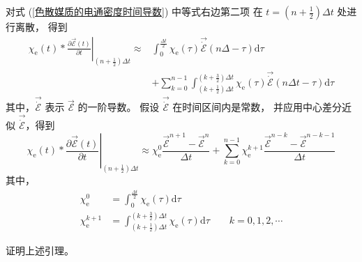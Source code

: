 \begin{lemma}
    对式 (\ref{色散媒质的电通密度时间导数}) 中等式右边第二项
    在 $t=\left(n+\frac{1}{2}\right)\Delta t$ 处进行离散，
    得到
    \begin{equation}
        \begin{aligned}
            \left.\chi_{\text{e}}(t) * 
            \frac{\partial \vec{\mathscr{E}}(t)}{\partial t}\right|_
            {\left(n+\frac{1}{2}\right)\Delta t}
            \approx
            &\int_{0}^{\frac{\Delta t}{2}}
            \chi_{\text{e}}(\tau)\vec{\dot{\mathscr{E}}}(n\Delta - \tau)\text{d}\tau\\
            &+
            \sum_{k=0}^{n-1}
            \int_{\left(k+\frac{1}{2}\right)\Delta t}^{\left(k+\frac{3}{2}\right)\Delta t}
            \chi_{\text{e}}(\tau)\vec{\dot{\mathscr{E}}}(n\Delta t - \tau)\text{d}\tau
        \end{aligned}
    \end{equation}
    其中，$\vec{\dot{\mathscr{E}}}$ 表示
    $\vec{\mathscr{E}}$ 的一阶导数。
    假设 $\vec{\dot{\mathscr{E}}}$ 在时间区间内是常数，
    并应用中心差分近似 $\vec{\dot{\mathscr{E}}}$，得到
    \begin{equation}
        \left.\chi_{\text{e}}(t) * 
        \frac{\partial \vec{\mathscr{E}}(t)}{\partial t}\right|_
        {\left(n+\frac{1}{2}\right)\Delta t}
        \approx
        \chi_{\text{e}}^0
        \frac{\vec{\mathscr{E}}^{n+1}-\vec{\mathscr{E}}^{n}}{\Delta t}
        +\sum_{k=0}^{n-1}
        \chi_{\text{e}}^{k+1}
        \frac{\vec{\mathscr{E}}^{n-k}-\vec{\mathscr{E}}^{n-k-1}}{\Delta t}
    \end{equation}
    其中，
    \begin{align}
        \chi_{\text{e}}^0&=\int_{0}^{\frac{\Delta t}{2}}
        \chi_{\text{e}}(\tau)\text{d}\tau\\
        \chi_{\text{e}}^{k+1}&=\int_{\left(k+\frac{1}{2}\right)\Delta t}^{\left(k+\frac{3}{2}\right)\Delta t}
        \chi_{\text{e}}(\tau)\text{d}\tau
        \qquad
        k=0,1,2,\cdots
    \end{align}
\end{lemma}

\begin{exercise}
    证明上述引理。
\end{exercise}

